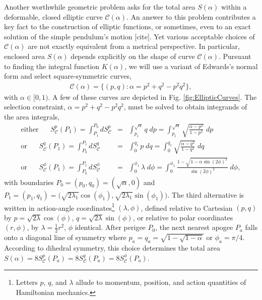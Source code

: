 \documentclass[nofootinbib,preprint]{revtex4-1}
\begin{document}
Another worthwhile geometric problem asks for the total area $S(\alpha)$ within a 
deformable, closed elliptic curve $\mathcal{C}(\alpha)$. An answer to this problem 
contributes a key fact to the construction of elliptic functions, or sometimes, even 
to an exact solution of the simple pendulum's motion [cite]. Yet various acceptable 
choices of $\mathcal{C}(\alpha)$ are not exactly equivalent from a metrical perspective. 
In particular, enclosed area $S(\alpha)$ depends explicitly on the shape of curve 
$\mathcal{C}(\alpha)$. Pursuant to finding the integral function $K(\alpha)$,
we will use a variant of Edwards's normal form and select square-symmetric curves,
\begin{eqnarray}
\mathcal{C}(\alpha) = \Big\{(p,q) : \alpha = p^2 + q^2 - p^2 q^2 \Big\}, \nonumber
\end{eqnarray}
with $\alpha \in [0,1)$. A few of these curves are depicted in Fig. \ref{fig:EllipticCurves}. 
The selection constraint, $\alpha = p^2 +q^2 - p^2q^2$, must be solved to obtain 
integrands of the area integrals, \FloatBarrier \noindent
\begin{eqnarray}
\text{either}\;\;\;\;\;\; S^{p}_{\mathcal{C}}(P_1)
 =  \int_{P_1}^{P_0}dS^{p}_{\mathcal{C}} 
&=& \int^{\sqrt{\alpha}}_{p_1} q \;dp  
= \int^{\sqrt{\alpha}}_{p_1} \sqrt{\frac{\alpha-p^2}{1-p^2}}\;dp  \nonumber \\
\text{or} \;\;\;\;\;\; S^{q}_{\mathcal{C}}(P_1) =  \int_{P_0}^{P_1}dS^{q}_{\mathcal{C}} 
&=& \int_{0}^{q_1} p \;dq  
= \int_{0}^{q_1} \sqrt{\frac{\alpha-q^2}{1-q^2}}\;dq  \nonumber \\
\text{or} \;\;\;\;\;\;  S^{\phi}_{\mathcal{C}}(P_1) 
= \int_{P_0}^{P_1} dS^{\phi}_{\mathcal{C}}
&=& \int_{0}^{\phi_1} \lambda \;d\phi
= \int_{0}^{\phi_1} \frac{1-\sqrt{1-\alpha \sin(2\phi)^2}}{\sin(2\phi)^2} \; d\phi,   \nonumber 
\end{eqnarray}
with boundaries $P_0=(p_0,q_0)=(\sqrt{\alpha},0)$ and 
$P_1=(p_1,q_1)=\Big(\sqrt{2\lambda_1}\cos(\phi_1),\sqrt{2\lambda_1}\sin(\phi_1)\Big)$. 
The third alternative is written in action-angle coordinates\footnote{Letters 
$p$, $q$, and $\lambda$ allude to momentum, position, and 
action quantities of Hamiltonian mechanics.} 
$(\lambda,\phi)$, defined relative to Cartesian $(p,q)$ by $p=\sqrt{2\lambda}\cos(\phi)$, 
$q=\sqrt{2\lambda}\sin(\phi)$, or relative to polar coordinates $(r,\phi)$, 
by $\lambda = \tfrac{1}{2} r^2$, $\phi$ identical. After perigee $P_0$, the 
next nearest apogee $P_{a}$ falls onto a diagonal line of symmetry where 
$p_a=q_a=\sqrt{1-\sqrt{1-\alpha}}$ or $\phi_a = \pi/4$. According to dihedral 
symmetry, this choice determines the total area 
$S(\alpha)=8S^{p}_\mathcal{C}(P_a)=8S^{q}_\mathcal{C}(P_a)=8S^{\phi}_\mathcal{C}(P_a)$.
\end{document}
